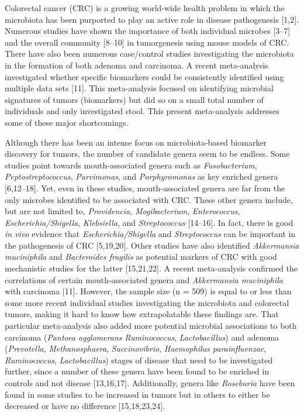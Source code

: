 \documentclass[12pt,]{article}
\begin{document}
Colorectal cancer (CRC) is a growing world-wide health problem in which
the microbiota has been purported to play an active role in disease
pathogenesis {[}1,2{]}. Numerous studies have shown the importance of
both individual microbes {[}3--7{]} and the overall community
{[}8--10{]} in tumorgenesis using mouse models of CRC. There have also
been numerous case/control studies investigating the microbiota in the
formation of both adenoma and carcinoma. A recent meta-analysis
investigated whether specific biomarkers could be consistently
identified using multiple data sets {[}11{]}. This meta-analysis focused
on identifying microbial signatures of tumors (biomarkers) but did so on
a small total number of individuals and only investigated stool. This
present meta-analysis addresses some of these major shortcomings.

Although there has been an intense focus on microbiota-based biomarker
discovery for tumors, the number of candidate genera seem to be endless.
Some studies point towards mouth-associated genera such as
\emph{Fusobacterium}, \emph{Peptostreptococcus}, \emph{Parvimonas}, and
\emph{Porphyromonas} as key enriched genera {[}6,12--18{]}. Yet, even in
these studies, mouth-associated genera are far from the only microbes
identified to be associated with CRC. These other genera include, but
are not limited to, \emph{Providencia}, \emph{Mogibacterium},
\emph{Enterococcus}, \emph{Escherichia/Shigella}, \emph{Klebsiella}, and
\emph{Streptococcus} {[}14--16{]}. In fact, there is good \emph{in vivo}
evidence that \emph{Escherichia/Shigella} and \emph{Streptococcus} can
be important in the pathogenesis of CRC {[}5,19,20{]}. Other studies
have also identified \emph{Akkermansia muciniphila} and
\emph{Bacteroides fragilis} as potential markers of CRC with good
mechanistic studies for the latter {[}15,21,22{]}. A recent
meta-analysis confirmed the correlations of certain mouth-associated
genera and \emph{Akkermansia muciniphila} with carcinoma {[}11{]}.
However, the sample size (n = 509) is equal to or less than some more
recent individual studies investigating the microbiota and colorectal
tumors, making it hard to know how extrapolatable these findings are.
That particular meta-analysis also added more potential microbial
associations to both carcinoma (\emph{Pantoea agglomerans}
\emph{Ruminococcus}, \emph{Lactobacillus}) and adenoma
(\emph{Prevotella}, \emph{Methanosphaera}, \emph{Succinovibrio},
\emph{Haemophilus parainfluenzae}, \emph{Ruminococcus},
\emph{Lactobacillus}) stages of disease that need to be investigated
further, since a number of these genera have been found to be enriched
in controls and not disease {[}13,16,17{]}. Additionally, genera like
\emph{Roseburia} have been found in some studies to be increased in
tumors but in others to either be decreased or have no difference
{[}15,18,23,24{]}.
\end{document}
